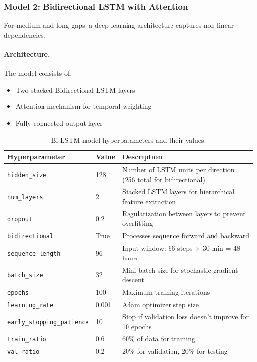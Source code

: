 \documentclass[12pt,a4paper]{article}
\begin{document}
\subsubsection{Model 2: Bidirectional LSTM with Attention}

For medium and long gaps, a deep learning architecture captures non-linear dependencies.

\paragraph{Architecture.} The model consists of:
\begin{itemize}[noitemsep]
    \item Two stacked Bidirectional LSTM layers
    \item Attention mechanism for temporal weighting
    \item Fully connected output layer
\end{itemize}

\begin{table}[H]
\centering
\caption{Bi-LSTM model hyperparameters and their values.}
\label{tab:lstm_params}
\begin{tabular}{@{}llp{7cm}@{}}
\toprule
\textbf{Hyperparameter} & \textbf{Value} & \textbf{Description} \\ \midrule
\texttt{hidden\_size} & 128 & Number of LSTM units per direction (256 total for bidirectional) \\
\texttt{num\_layers} & 2 & Stacked LSTM layers for hierarchical feature extraction \\
\texttt{dropout} & 0.2 & Regularization between layers to prevent overfitting \\
\texttt{bidirectional} & True & Processes sequence forward and backward \\
\texttt{sequence\_length} & 96 & Input window: 96 steps $\times$ 30 min = 48 hours \\
\texttt{batch\_size} & 32 & Mini-batch size for stochastic gradient descent \\
\texttt{epochs} & 100 & Maximum training iterations \\
\texttt{learning\_rate} & 0.001 & Adam optimizer step size \\
\texttt{early\_stopping\_patience} & 10 & Stop if validation loss doesn't improve for 10 epochs \\
\texttt{train\_ratio} & 0.6 & 60\% of data for training \\
\texttt{val\_ratio} & 0.2 & 20\% for validation, 20\% for testing \\
\bottomrule
\end{tabular}
\end{table}
\end{document}
